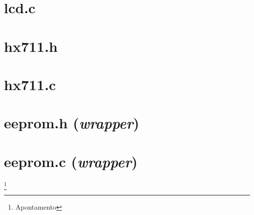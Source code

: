 \section*{lcd.c}

\newpage
\section*{hx711.h}

\newpage
\section*{hx711.c}

\newpage
\section*{eeprom.h (\textit{wrapper})}

\newpage
\section*{eeprom.c (\textit{wrapper})}

\restoregeometry
\newpage

\newpage

%
%
%

\newpage
\footnote{Apontamento}
